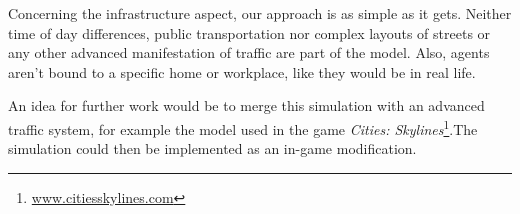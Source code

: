 \documentclass[table]{sig-alternate-05-2015}
\begin{document}
Concerning the infrastructure aspect, our approach is as simple as it gets. Neither time of day differences, public transportation nor complex layouts of streets or any other advanced manifestation of traffic are part of the model. Also, agents aren't bound to a specific home or workplace, like they would be in real life. 

An idea for further work would be to merge this simulation with an advanced traffic system, for example the model used in the game \textit{Cities: Skylines}\footnote{\url{www.citiesskylines.com}}.The simulation could then be implemented as an in-game modification.




  
\end{document}
